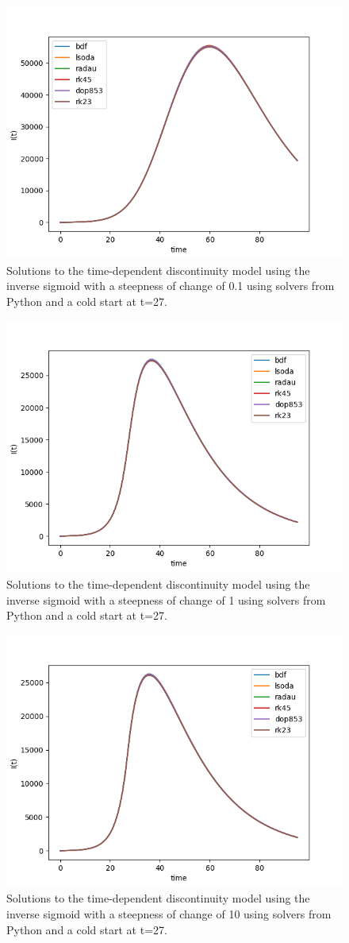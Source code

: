 \begin{figure}[H]
\centering
\includegraphics[width=0.7\linewidth]{./figures/exp_time_disc_hand_0_1}
\caption{Solutions to the time-dependent discontinuity model using the inverse sigmoid with a steepness of change of 0.1 using solvers from Python and a cold start at t=27.}
\label{fig:exp_time_disc_hand_0_1}
\end{figure}

\begin{figure}[H]
\centering
\includegraphics[width=0.7\linewidth]{./figures/exp_time_disc_hand_1}
\caption{Solutions to the time-dependent discontinuity model using the inverse sigmoid with a steepness of change of 1 using solvers from Python and a cold start at t=27.}
\label{fig:exp_time_disc_hand_1}
\end{figure}

\begin{figure}[H]
\centering
\includegraphics[width=0.7\linewidth]{./figures/exp_time_disc_hand_10}
\caption{Solutions to the time-dependent discontinuity model using the inverse sigmoid with a steepness of change of 10 using solvers from Python and a cold start at t=27.}
\label{fig:exp_time_disc_hand_10}
\end{figure}

